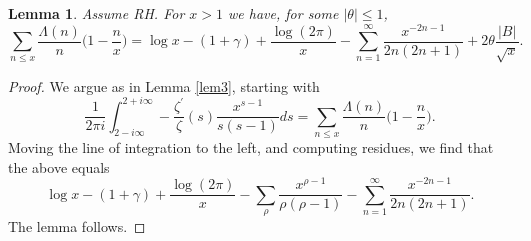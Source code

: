 \documentclass [12pt]{amsart}
\newtheorem{lemma}{Lemma}[section]
\numberwithin{equation}{section}
\begin{document}
\begin{lemma} \label{lem4} Assume RH.  For $x>1$ we have, for some $|\theta| \le 1$, 
$$ 
\sum_{n\le x} \frac{\Lambda(n)}{n} \Big( 1-\frac nx\Big) =  \log x - (1+\gamma) + 
\frac{\log (2\pi)}{x} - \sum_{n=1}^{\infty} \frac{x^{-2n-1}}{2n(2n+1)} 
+ 2 \theta \frac{|B|}{\sqrt{x}}. 
$$ 
\end{lemma} 
\begin{proof}  We argue as in Lemma \ref{lem3}, starting with 
$$ 
\frac{1}{2\pi i} \int_{2-i\infty}^{2+i\infty} -\frac{\zeta^{\prime}}{\zeta}(s) \frac{x^{s-1}}{s(s-1)}ds 
= \sum_{n\le x} \frac{\Lambda(n)}{n} \Big(1-\frac nx\Big). 
$$
Moving the line of integration to the left, and computing residues, we find that the 
above equals 
$$ 
\log x - (1+\gamma) + \frac{\log (2\pi)}{x} - \sum_{\rho} \frac{x^{\rho-1}}{\rho(\rho-1)} 
- \sum_{n=1}^{\infty} \frac{x^{-2n-1}}{2n(2n+1)}.
$$
The lemma follows.
\end{proof} 
\end{document}
